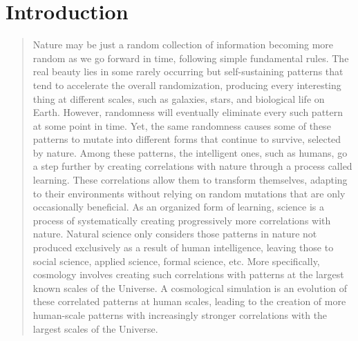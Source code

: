 \chapter{Introduction}
\label{chap:intro}

\begin{quote}
Nature may be just a random collection of information becoming more random as we go forward in time, following simple fundamental rules. The real beauty lies in some rarely occurring but self-sustaining patterns that tend to accelerate the overall randomization, producing every interesting thing at different scales, such as galaxies, stars, and biological life on Earth. However, randomness will eventually eliminate every such pattern at some point in time. Yet, the same randomness causes some of these patterns to mutate into different forms that continue to survive, selected by nature. Among these patterns, the intelligent ones, such as humans, go a step further by creating correlations with nature through a process called learning. These correlations allow them to transform themselves, adapting to their environments without relying on random mutations that are only occasionally beneficial. As an organized form of learning, science is a process of systematically creating progressively more correlations with nature. Natural science only considers those patterns in nature not produced exclusively as a result of human intelligence, leaving those to social science, applied science, formal science, etc. More specifically, cosmology involves creating such correlations with patterns at the largest known scales of the Universe. A cosmological simulation is an evolution of these correlated patterns at human scales, leading to the creation of more human-scale patterns with increasingly stronger correlations with the largest scales of the Universe.

    
    
\end{quote}
    
